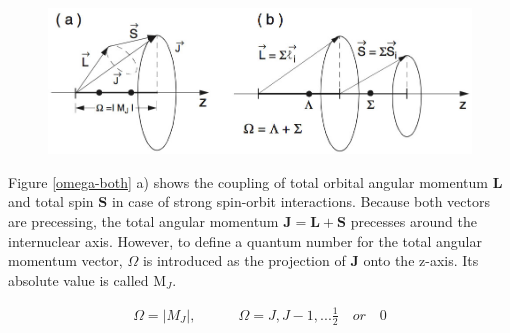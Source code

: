 \documentclass[parskip,12pt,headsepline,a4paper] {scrbook}
\begin{document}
\begin{figure}[ht]
\centerline{
\includegraphics[width=14cm]{./spectroscopy/omega-molecule.jpg}}
\end{figure}

Figure \ref{omega-both} a) shows the coupling of total orbital angular momentum $\boldsymbol{L}$ and total spin $\boldsymbol{S}$ in case of strong spin-orbit interactions. Because both vectors are precessing, the total angular momentum $\boldsymbol{J} = \boldsymbol{L} + \boldsymbol{S}$ precesses around the internuclear axis. However, to define a quantum number for the total angular momentum vector, $\Omega$ is introduced as the projection of $\boldsymbol{J}$ onto the z-axis. Its absolute value is called M$_J$.

\begin{align}  \label{total-omega}
\Omega = |M_J|, \quad \quad \quad \Omega = J, J - 1,...\frac{1}{2} \quad or \quad 0
\end{align}
\end{document}
